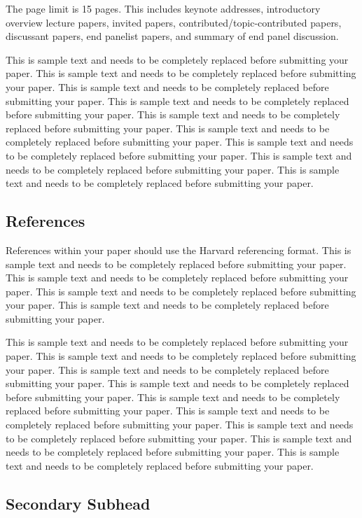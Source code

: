 \documentclass[11pt]{asaproc}
\begin{document}
The page limit is 15 pages. This includes keynote addresses, introductory overview lecture papers, invited papers, contributed/topic-contributed papers, discussant papers, end panelist papers, and summary of end panel discussion.

This is sample text and needs to be completely replaced before submitting your paper. This is sample text and needs to be completely replaced before submitting your paper. This is sample text and needs to be completely replaced before submitting your paper. This is sample text and needs to be completely replaced before submitting your paper. This is sample text and needs to be completely replaced before submitting your paper. This is sample text and needs to be completely replaced before submitting your paper. This is sample text and needs to be completely replaced before submitting your paper. This is sample text and needs to be completely replaced before submitting your paper. This is sample text and needs to be completely replaced before submitting your paper. 

\subsection{References}

References within your paper should use the Harvard referencing format. This is sample text and needs to be completely replaced before submitting your paper. This is sample text and needs to be completely replaced before submitting your paper. This is sample text and needs to be completely replaced before submitting your paper. This is sample text and needs to be completely replaced before submitting your paper.

This is sample text and needs to be completely replaced before submitting your paper. This is sample text and needs to be completely replaced before submitting your paper. This is sample text and needs to be completely replaced before submitting your paper. This is sample text and needs to be completely replaced before submitting your paper. This is sample text and needs to be completely replaced before submitting your paper. This is sample text and needs to be completely replaced before submitting your paper. This is sample text and needs to be completely replaced before submitting your paper. This is sample text and needs to be completely replaced before submitting your paper. This is sample text and needs to be completely replaced before submitting your paper. 

\subsection{Secondary Subhead}
\end{document}
